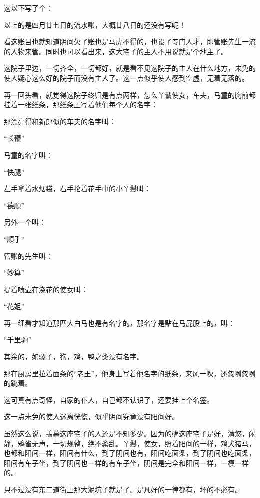\par 这以下写了个：
\par 以上的是四月廿七日的流水账，大概廿八日的还没有写呢！
\par 看这账目也就知道阴间欠了账也是马虎不得的，也设了专门人才，即管账先生一流的人物来管。同时也可以看出来，这大宅子的主人不用说就是个地主了。
\par 这院子里边，一切齐全，一切都好，就是看不见这院子的主人在什么地方，未免的使人疑心这么好的院子而没有主人了。这一点似乎使人感到空虚，无着无落的。
\par 再一回头看，就觉得这院子终归是有点两样，怎么丫鬟使女，车夫，马童的胸前都挂着一张纸条，那纸条上写着他们每个人的名字：
\par 那漂亮得和新郎似的车夫的名字叫：
\par “长鞭”
\par 马童的名字叫：
\par “快腿”
\par 左手拿着水烟袋，右手抡着花手巾的小丫鬟叫：
\par “德顺”
\par 另外一个叫：
\par “顺手”
\par 管账的先生叫：
\par “妙算”
\par 提着喷壶在浇花的使女叫：
\par “花姐”
\par 再一细看才知道那匹大白马也是有名字的，那名字是贴在马屁股上的，叫：
\par “千里驹”
\par 其余的，如骡子，狗，鸡，鸭之类没有名字。
\par 那在厨房里拉着面条的“老王”，他身上写着他名字的纸条，来风一吹，还忽咧忽咧的跳着。
\par 这可真有点奇怪，自家的仆人，自己都不认识了，还要挂上个名签。
\par 这一点未免的使人迷离恍惚，似乎阴间究竟没有阳间好。
\par 虽然这么说，羡慕这座宅子的人还是不知多少。因为的确这座宅子是好，清悠，闲静，鸦雀无声，一切规整，绝不紊乱。丫鬟，使女，照着阳间的一样，鸡犬猪马，也都和阳间一样，阳间有什么，到了阴间也有，阳间吃面条，到了阴间也吃面条，阳间有车子坐，到了阴间也一样的有车子坐，阴间是完全和阳间一样，一模一样的。
\par 只不过没有东二道街上那大泥坑子就是了。是凡好的一律都有，坏的不必有。
